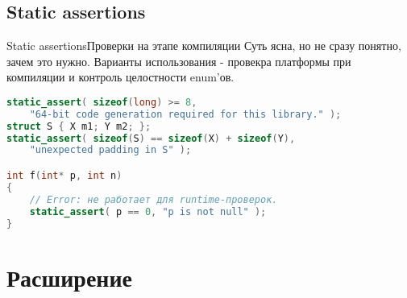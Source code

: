 \documentclass[10pt]{beamer}
\begin{document}
\subsection{Static assertions}
\hypertarget{Static assertions}{}
\begin{frame}[fragile]{Static assertions}{Проверки на этапе компиляции}
Суть ясна, но не сразу понятно, зачем это нужно. Варианты использования - провекра платформы при компиляции и контроль целостности enum'ов.
\begin{lstlisting}[language=C++]
static_assert( sizeof(long) >= 8, 
    "64-bit code generation required for this library." );
struct S { X m1; Y m2; };
static_assert( sizeof(S) == sizeof(X) + sizeof(Y), 
    "unexpected padding in S" );

int f(int* p, int n)
{
    // Error: не работает для runtime-проверок.
    static_assert( p == 0, "p is not null" ); 
}

\end{lstlisting}
\end{frame}

\section{Расширение}
\end{document}
